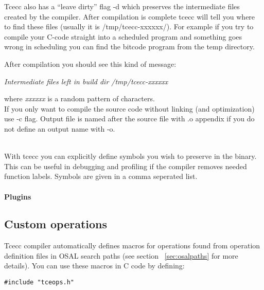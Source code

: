\documentclass[twoside]{tceusermanual}
\begin{document}
Tcecc also has a ``leave dirty'' flag -d which preserves the intermediate
files created by the compiler. After compilation is complete tcecc will tell
you where to find these files (usually it is /tmp/tcecc-xxxxxx/). For example
if you try to compile your C-code straight into a scheduled program and
something goes wrong in scheduling you can find the bitcode program from the
temp directory.


After compilation you should see this kind of message:

\textit{Intermediate files left in build dir /tmp/tcecc-xxxxxx}

where \textit{xxxxxx} is a random pattern of characters. \\

If you only want to compile the source code without linking
(and optimization) use -c flag. Output file is named after the source file
with .o appendix if you do not define an output name with -o.


 \\

With tcecc you can explicitly define symbols you wish to preserve in the
binary. This can be useful in debugging and profiling if the compiler removes
needed function labels.
Symbols are given in a comma seperated list.


\paragraph{Plugins}

\subsection{Custom operations}
\label{sec:tceccCustOp}

Tcecc compiler automatically defines macros for operations found from
operation definition files in OSAL search paths (see section 
~\ref{sec:osalpaths} for more details). You can use these macros in C code
by defining:
\begin{verbatim}
#include "tceops.h"
\end{verbatim}
\end{document}
